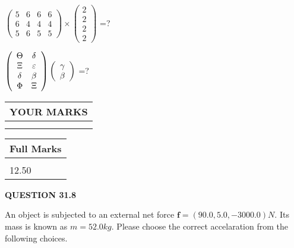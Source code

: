 \documentclass[12pt]{article}
\begin{document}
  
 
$ \left( \begin{array}{ccccccccc}
           5  & 
           6  & 
           6  & 
           6  \\ 
           6  & 
           4  & 
           4  & 
           4  \\ 
           5  & 
           6  & 
           5  & 
           5
\end{array}\right) \times
\left( \begin{array}{c}
           2  \\ 
           2  \\ 
           2  \\ 
           2
\end{array}\right) $ =?
 
 
$  %
 \left( \begin{array}
 {
 c
 c
 }
 \Theta & 
 \delta \\ 
                    \Xi & 
 \varepsilon \\ 
 \delta & 
 \beta \\ 
 \Phi & 
                    \Xi
 \end{array} \right)
 \left( \begin{array}
 {
 c
 }
 \gamma \\ 
 \beta
 \end{array} \right)
$ =?
 

 

 
\vspace{0.3in}
  
\vspace{0.2in}
  
\noindent\begin{tabular}{|l|}
\hline
 YOUR MARKS  \\
\hline
 \\ 
 \\ 
\hline
\end{tabular}
\hspace{0.05in} \begin{tabular}{|l|}
\hline
 Full Marks  \\
\hline
 \\ 
12.50 \\
\hline
\end{tabular}
{\textbf{\Large{QUESTION
31.8 
}}}
  
  
 
An object is subjected to an external net force $\mathbf{f}=
(90.0 , 5.0 , -3000.0) N$.
Its mass is known as $m= %
52.0 kg$.
Please choose the correct accelaration from the following choices.
  
\end{document}
